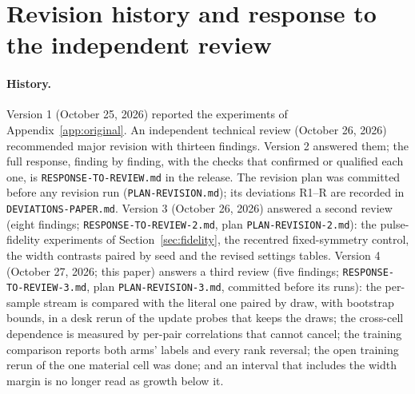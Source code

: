 \section{Revision history and response to the independent review}\label{app:revision}
\paragraph{History.} Version 1 (October 25, 2026) reported the experiments of Appendix~\ref{app:original}. An independent
technical review (October 26, 2026) recommended major revision with thirteen findings. Version 2 answered them; the
full response, finding by finding, with the checks that confirmed or qualified each one, is \texttt{RESPONSE-TO-REVIEW.md} in
the release. The revision plan was committed before any revision run (\texttt{PLAN-REVISION.md}); its deviations R1--R\RVnDev{}
are recorded in \texttt{DEVIATIONS-PAPER.md}. Version 3 (October 26, 2026) answered a second review (eight findings;
\texttt{RESPONSE-TO-REVIEW-2.md}, plan \texttt{PLAN-REVISION-2.md}): the pulse-fidelity experiments of
Section~\ref{sec:fidelity}, the recentred fixed-symmetry control, the width contrasts paired by seed and the revised
settings tables. Version 4 (October 27, 2026; this paper) answers a third review (five findings;
\texttt{RESPONSE-TO-REVIEW-3.md}, plan \texttt{PLAN-REVISION-3.md}, committed before its runs): the per-sample stream is
compared with the literal one paired by draw, with bootstrap bounds, in a desk rerun of the update probes that keeps the
draws; the cross-cell dependence is measured by per-pair correlations that cannot cancel; the training comparison reports
both arms' labels and every rank reversal; the open training rerun of the one material cell was done; and an interval that
includes the width margin is no longer read as growth below it.

